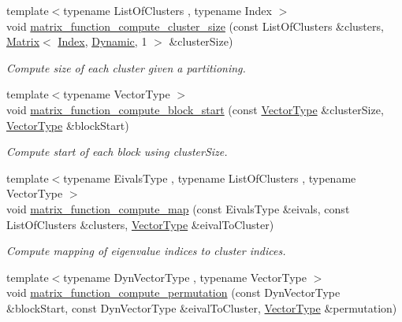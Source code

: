 \begin{DoxyCompactItemize}
{\footnotesize template$<$typename List\+Of\+Clusters , typename Index $>$ }\\void \hyperlink{namespace_eigen_1_1internal_a1073ba7ac499827baa04c814e4251326}{matrix\+\_\+function\+\_\+compute\+\_\+cluster\+\_\+size} (const List\+Of\+Clusters \&clusters, \hyperlink{group___core___module_class_eigen_1_1_matrix}{Matrix}$<$ \hyperlink{namespace_eigen_a62e77e0933482dafde8fe197d9a2cfde}{Index}, \hyperlink{namespace_eigen_ad81fa7195215a0ce30017dfac309f0b2}{Dynamic}, 1 $>$ \&cluster\+Size)
\begin{DoxyCompactList}\small\item\em Compute size of each cluster given a partitioning. \end{DoxyCompactList}\item 
\mbox{\label{namespace_eigen_1_1internal_a2144f635d30028a25e7eb3510c315ad3}} 
{\footnotesize template$<$typename Vector\+Type $>$ }\\void \hyperlink{namespace_eigen_1_1internal_a2144f635d30028a25e7eb3510c315ad3}{matrix\+\_\+function\+\_\+compute\+\_\+block\+\_\+start} (const \hyperlink{struct_vector_type}{Vector\+Type} \&cluster\+Size, \hyperlink{struct_vector_type}{Vector\+Type} \&block\+Start)
\begin{DoxyCompactList}\small\item\em Compute start of each block using cluster\+Size. \end{DoxyCompactList}\item 
\mbox{\label{namespace_eigen_1_1internal_ade67364a006320cd7103f0f3366def09}} 
{\footnotesize template$<$typename Eivals\+Type , typename List\+Of\+Clusters , typename Vector\+Type $>$ }\\void \hyperlink{namespace_eigen_1_1internal_ade67364a006320cd7103f0f3366def09}{matrix\+\_\+function\+\_\+compute\+\_\+map} (const Eivals\+Type \&eivals, const List\+Of\+Clusters \&clusters, \hyperlink{struct_vector_type}{Vector\+Type} \&eival\+To\+Cluster)
\begin{DoxyCompactList}\small\item\em Compute mapping of eigenvalue indices to cluster indices. \end{DoxyCompactList}\item 
\mbox{\label{namespace_eigen_1_1internal_a0434fe5b0ec47e69b8e351ef9e131bcd}} 
{\footnotesize template$<$typename Dyn\+Vector\+Type , typename Vector\+Type $>$ }\\void \hyperlink{namespace_eigen_1_1internal_a0434fe5b0ec47e69b8e351ef9e131bcd}{matrix\+\_\+function\+\_\+compute\+\_\+permutation} (const Dyn\+Vector\+Type \&block\+Start, const Dyn\+Vector\+Type \&eival\+To\+Cluster, \hyperlink{struct_vector_type}{Vector\+Type} \&permutation)

\end{DoxyCompactItemize}

